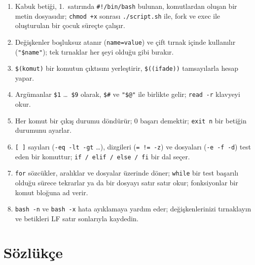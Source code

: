 \documentclass[11pt,a4paper]{article}
\newcommand{\cmd}[1]{\texttt{#1}}
\begin{document}
\begin{keyidea}
\begin{enumerate}[leftmargin=1.4em]
  \item Kabuk betiği, 1.~satırında \texttt{\#!/bin/bash} bulunan, komutlardan oluşan bir metin dosyasıdır; \cmd{chmod +x} sonrası \texttt{./script.sh} ile, fork ve exec ile oluşturulan bir çocuk süreçte çalışır.
  \item Değişkenler boşluksuz atanır (\texttt{name=value}) ve çift tırnak içinde kullanılır (\texttt{"\$name"}); tek tırnaklar her şeyi olduğu gibi bırakır.
  \item \texttt{\$(komut)} bir komutun çıktısını yerleştirir, \texttt{\$((ifade))} tamsayılarla hesap yapar.
  \item Argümanlar \texttt{\$1} \ldots\ \texttt{\$9} olarak, \texttt{\$\#} ve \texttt{"\$@"} ile birlikte gelir; \texttt{read -r} klavyeyi okur.
  \item Her komut bir çıkış durumu döndürür; $0$ başarı demektir; \texttt{exit n} bir betiğin durumunu ayarlar.
  \item \texttt{[ ]} sayıları (\texttt{-eq -lt -gt} \ldots), dizgileri (\texttt{= != -z}) ve dosyaları (\texttt{-e -f -d}) test eden bir komuttur; \texttt{if / elif / else / fi} bir dal seçer.
  \item \texttt{for} sözcükler, aralıklar ve dosyalar üzerinde döner; \texttt{while} bir test başarılı olduğu sürece tekrarlar ya da bir dosyayı satır satır okur; fonksiyonlar bir komut bloğuna ad verir.
  \item \texttt{bash -n} ve \texttt{bash -x} hata ayıklamaya yardım eder; değişkenlerinizi tırnaklayın ve betikleri LF satır sonlarıyla kaydedin.
\end{enumerate}
\end{keyidea}

\section{Sözlükçe}
\end{document}
